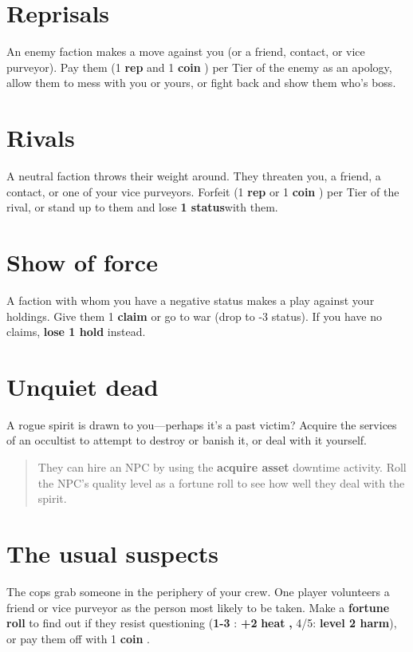 \documentclass[11pt,fleqn,a5paper]{book}
\newcommand{\gameterm}[1]{\textbf{#1}}
\begin{document}
\section{Reprisals}

An enemy faction makes a move against you (or a friend, contact, or vice purveyor). Pay them (1 \gameterm{rep}  and 1 \gameterm{coin} ) per Tier of the enemy as an apology, allow them to mess with you or yours, or fight back and show them who’s boss.

\section{Rivals}

A neutral faction throws their weight around. They threaten you, a friend, a contact, or one of your vice purveyors. Forfeit (1 \gameterm{rep}  or 1 \gameterm{coin} ) per Tier of the rival, or stand up to them and lose\textbf{ 1 status}with them.

\section{Show of force}

A faction with whom you have a negative status makes a play against your holdings. Give them 1 \textbf{claim} or go to war (drop to -3 status). If you have no claims, \textbf{lose 1 hold} instead.

\section{Unquiet dead}

A rogue spirit is drawn to you---perhaps it’s a past victim? Acquire the services of an occultist to attempt to destroy or banish it, or deal with it yourself.

\begin{quote}
	They can hire an NPC by using the \gameterm{acquire asset} downtime activity. Roll the NPC’s quality level as a fortune roll to see how well they deal with the spirit.
\end{quote} 

\section{The usual suspects}

The cops grab someone in the periphery of your crew. One player volunteers a friend or vice purveyor as the person most likely to be taken. Make a \textbf{fortune roll} to find out if they resist questioning (\gameterm{1-3} : \textbf{+2 }\gameterm{heat} \textbf{, }4/5:\textbf{ level 2 harm}), or pay them off with 1 \gameterm{coin} .
\end{document}
